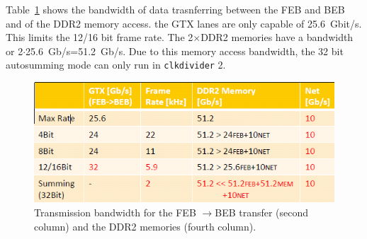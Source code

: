 \documentclass{article}
\begin{document}
Table~\ref{tx} shows the bandwidth of data trasnferring between the FEB and BEB and of the DDR2 memory access. the GTX lanes are only capable of 25.6~Gbit/s. This limits the 12/16 bit frame rate. The 2$\times$DDR2 memories have a bandwidth or 2$\cdot$25.6~Gb/s=51.2~Gb/s. Due to this memory access bandwidth, the 32 bit autosumming mode can only run in {\tt{clkdivider}} 2.   
\begin{figure}[t]
\begin{center}
\includegraphics[width=1.\textwidth]{TansmissionRates}
\end{center}
\caption{Transmission bandwidth for the FEB $\to$BEB transfer (second column) and the DDR2 memories (fourth column). }
\label{tx}
\end{figure}
\end{document}
